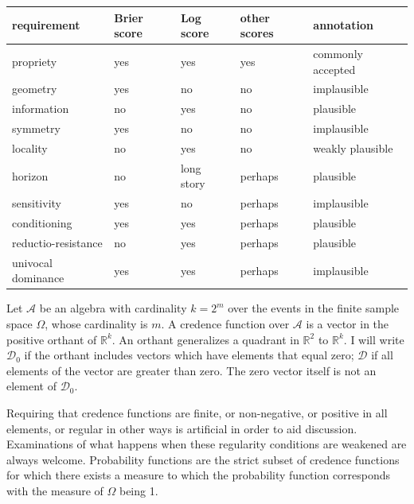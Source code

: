 \documentclass[12pt]{article}
\begin{document}
\medskip

\begin{tabular}{|l|l|l|l|l|}\hline
  \textbf{requirement} & \textbf{Brier score} & \textbf{Log score} & \textbf{other scores} & \textbf{annotation} \\ \hline
  propriety & yes & yes & yes & commonly accepted \\ \hline
  geometry & yes & no & no & implausible \\ \hline
  information & no & yes & no & plausible \\ \hline
  symmetry & yes & no & no & implausible \\ \hline
  locality & no & yes & no & weakly plausible \\ \hline
  horizon & no & long story & perhaps & plausible \\ \hline
  sensitivity & yes & no & perhaps & implausible \\ \hline
  conditioning & yes & yes & perhaps & plausible \\ \hline
  reductio-resistance & no & yes & perhaps & plausible \\ \hline
  univocal dominance & yes & yes & perhaps & implausible \\ \hline
\end{tabular}

\medskip

Let $\mathcal{A}$ be an algebra with cardinality $k=2^{m}$ over the
events in the finite sample space $\Omega$, whose cardinality is $m$.
A credence function over $\mathcal{A}$ is a vector in the positive
orthant of $\mathbb{R}^{k}$. An orthant generalizes a quadrant in
$\mathbb{R}^{2}$ to $\mathbb{R}^{k}$. I will write $\mathcal{D}_{0}$
if the orthant includes vectors which have elements that equal zero;
$\mathcal{D}$ if all elements of the vector are greater than zero. The
zero vector itself is not an element of $\mathcal{D}_{0}$.

Requiring that credence functions are finite, or non-negative, or
positive in all elements, or regular in other ways is artificial in
order to aid discussion. Examinations of what happens when these
regularity conditions are weakened are always welcome. Probability
functions are the strict subset of credence functions for which there
exists a measure to which the probability function corresponds with
the measure of $\Omega$ being 1.
\end{document}
